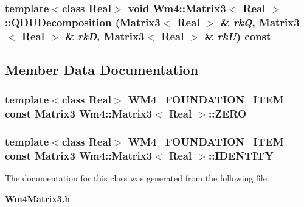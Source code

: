 \subsubsection{\setlength{\rightskip}{0pt plus 5cm}template$<$class Real$>$ void {\bf Wm4::Matrix3}$<$ Real $>$::QDUDecomposition ({\bf Matrix3}$<$ Real $>$ \& {\em rk\-Q}, {\bf Matrix3}$<$ Real $>$ \& {\em rk\-D}, {\bf Matrix3}$<$ Real $>$ \& {\em rk\-U}) const}\label{classWm4_1_1Matrix3_d1b0e1980faaeeb3ea6ba82c2c9759ba}




\subsection{Member Data Documentation}
\subsubsection{\setlength{\rightskip}{0pt plus 5cm}template$<$class Real$>$ WM4\_\-FOUNDATION\_\-ITEM const {\bf Matrix3} {\bf Wm4::Matrix3}$<$ Real $>$::{\bf ZERO}\hspace{0.3cm}{\tt  [static]}}\label{classWm4_1_1Matrix3_86ae6f7aebf5479b5aa493e9db3b8b8c}


\subsubsection{\setlength{\rightskip}{0pt plus 5cm}template$<$class Real$>$ WM4\_\-FOUNDATION\_\-ITEM const {\bf Matrix3} {\bf Wm4::Matrix3}$<$ Real $>$::{\bf IDENTITY}\hspace{0.3cm}{\tt  [static]}}\label{classWm4_1_1Matrix3_1db157892ee1ae493df1edff649b61a1}




The documentation for this class was generated from the following file:\begin{CompactItemize}
\item 
{\bf Wm4Matrix3.h}\end{CompactItemize}
